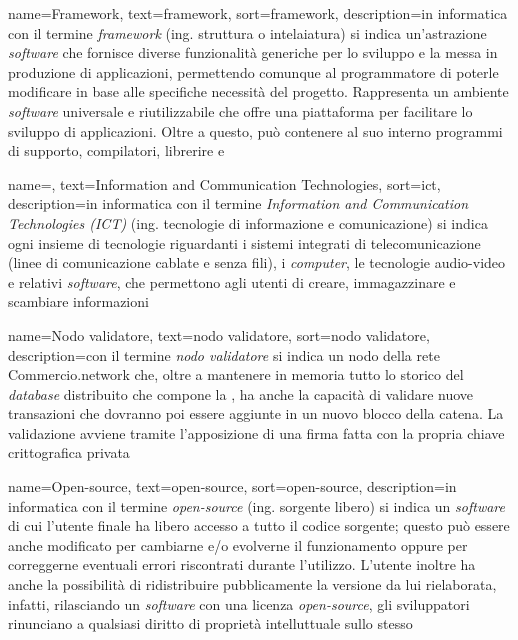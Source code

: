 {
	name=Framework,
	text=framework,
	sort=framework,
	description={in informatica con il termine \emph{framework} (ing. struttura o intelaiatura) si indica un'astrazione \textit{software} che fornisce diverse funzionalità generiche per lo sviluppo e la messa in produzione di applicazioni, permettendo comunque al programmatore di poterle modificare in base alle specifiche necessità del progetto. Rappresenta un ambiente \textit{software} universale e riutilizzabile che offre una piattaforma per facilitare lo sviluppo di applicazioni. Oltre a questo, può contenere al suo interno programmi di supporto, compilatori, librerire e }
}

{
	name=,
	text=Information and Communication Technologies,
	sort=ict,
	description={in informatica con il termine \emph{Information and Communication Technologies (ICT)} (ing. tecnologie di informazione e comunicazione) si indica ogni insieme di tecnologie riguardanti i sistemi integrati di telecomunicazione (linee di comunicazione cablate e senza fili), i \textit{computer}, le tecnologie audio-video e relativi \textit{software}, che permettono agli utenti di creare, immagazzinare e scambiare informazioni}
}

{
	name=Nodo validatore,
	text=nodo validatore,
	sort=nodo validatore,
	description={con il termine \emph{nodo validatore} si indica un nodo della rete Commercio.network che, oltre a mantenere in memoria tutto lo storico del \textit{database} distribuito che compone la , ha anche la capacità di validare nuove transazioni che dovranno poi essere aggiunte in un nuovo blocco della catena. La validazione avviene tramite l'apposizione di una firma fatta con la propria chiave crittografica privata}
}

{
	name=Open-source,
	text=open-source,
	sort=open-source,
	description={in informatica con il termine \emph{open-source} (ing. sorgente libero) si indica un \textit{software} di cui l'utente finale ha libero accesso a tutto il codice sorgente; questo può essere anche modificato per cambiarne e/o evolverne il funzionamento oppure per correggerne eventuali errori riscontrati durante l'utilizzo. L'utente inoltre ha anche la possibilità di ridistribuire pubblicamente la versione da lui rielaborata, infatti, rilasciando un \textit{software} con una licenza \emph{open-source}, gli sviluppatori rinunciano a qualsiasi diritto di proprietà intelluttuale sullo stesso}
}


